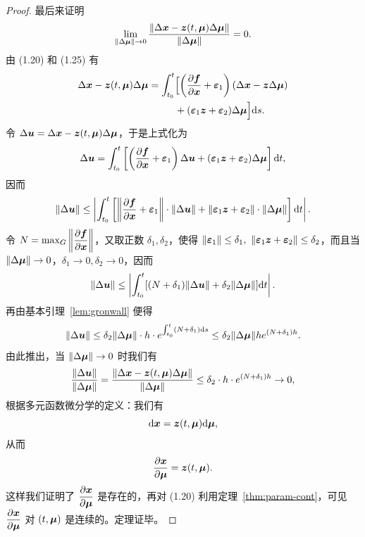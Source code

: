 \begin{proof}
	最后来证明
	\[
		\lim_{\|\Delta\boldsymbol{\mu}\| \to 0} \frac{\|\Delta\boldsymbol{x} - \boldsymbol{z}(t, \boldsymbol{\mu})\Delta\boldsymbol{\mu}\|}{\|\Delta\boldsymbol{\mu}\|} = 0.
	\]
	由 (1.20) 和 (1.25) 有
	\begin{align*}
		\Delta\boldsymbol{x} - \boldsymbol{z}(t, \boldsymbol{\mu})\Delta\boldsymbol{\mu} 
		= \int_{t_0}^t &\Bigl[\left(\frac{\partial \boldsymbol{f}}{\partial \boldsymbol{x}} + \boldsymbol{\varepsilon}_1\right)(\Delta\boldsymbol{x} - \boldsymbol{z}\Delta\boldsymbol{\mu}) \\
		&+ (\boldsymbol{\varepsilon}_1 \boldsymbol{z} + \boldsymbol{\varepsilon}_2)\Delta\boldsymbol{\mu}\Bigr]\mathrm{d} s.
	\end{align*}
	令 $\Delta\boldsymbol{u} = \Delta\boldsymbol{x} - \boldsymbol{z}(t, \boldsymbol{\mu})\Delta\boldsymbol{\mu}$，于是上式化为
	\[
		\Delta\boldsymbol{u} = \int_{t_0}^t \left[\left(\frac{\partial \boldsymbol{f}}{\partial \boldsymbol{x}} + \boldsymbol{\varepsilon}_1\right)\Delta\boldsymbol{u} + (\boldsymbol{\varepsilon}_1 \boldsymbol{z} + \boldsymbol{\varepsilon}_2)\Delta\boldsymbol{\mu}\right]\mathrm{d} t,
	\]
	因而
	\[
		\|\Delta\boldsymbol{u}\| \leq \left|\int_{t_0}^t \left[\left\|\frac{\partial \boldsymbol{f}}{\partial \boldsymbol{x}} + \boldsymbol{\varepsilon}_1\right\| \cdot \|\Delta\boldsymbol{u}\| + \|\boldsymbol{\varepsilon}_1 \boldsymbol{z} + \boldsymbol{\varepsilon}_2\| \cdot \|\Delta\boldsymbol{\mu}\|\right]\mathrm{d} t\right|.
	\]
	令 $N = \max_G \left\|\dfrac{\partial \boldsymbol{f}}{\partial \boldsymbol{x}}\right\|$，又取正数 $\delta_1, \delta_2$，使得 $\|\vect{\varepsilon}_1\| \leq \delta_1,\ \|\vect{\varepsilon}_1 \vect{z} + \vect{\varepsilon}_2\| \leq \delta_2$，而且当 $\|\Delta\boldsymbol{\mu}\| \to 0$，$\delta_1 \to 0, \delta_2 \to 0$，因而
	\[
		\|\Delta\boldsymbol{u}\| \leq \left|\int_{t_0}^t [(N + \delta_1)\|\Delta\boldsymbol{u}\| + \delta_2\|\Delta\boldsymbol{\mu}\|]\mathrm{d} t\right|.
	\]
	再由基本引理~\ref{lem:gronwall} 便得
	\[
		\|\Delta\boldsymbol{u}\| \leq \delta_2 \|\Delta\boldsymbol{\mu}\| \cdot h \cdot e^{\int_{t_0}^t (N + \delta_1)\mathrm{d} s} 
		\leq \delta_2 \|\Delta\boldsymbol{\mu}\| h e^{(N + \delta_1)h}.
	\]
	由此推出，当 $\|\Delta\boldsymbol{\mu}\| \to 0$ 时我们有
	\[
		\frac{\|\Delta\boldsymbol{u}\|}{\|\Delta\boldsymbol{\mu}\|} 
		= \frac{\|\Delta\boldsymbol{x} - \boldsymbol{z}(t, \boldsymbol{\mu})\Delta\boldsymbol{\mu}\|}{\|\Delta\boldsymbol{\mu}\|} 
		\leq \delta_2 \cdot h \cdot e^{(N + \delta_1)h} \to 0,
	\]
	根据多元函数微分学的定义：我们有
	\[
		\mathrm{d}\boldsymbol{x} = \boldsymbol{z}(t, \boldsymbol{\mu})\mathrm{d}\boldsymbol{\mu},
	\]
	从而
	\[
		\frac{\partial \boldsymbol{x}}{\partial \boldsymbol{\mu}} = \boldsymbol{z}(t, \boldsymbol{\mu}).
	\]
	这样我们证明了 $\dfrac{\partial \boldsymbol{x}}{\partial \boldsymbol{\mu}}$ 是存在的，再对 (1.20) 利用定理~\ref{thm:param-cont}，可见 $\dfrac{\partial \boldsymbol{x}}{\partial \boldsymbol{\mu}}$ 对 $(t, \boldsymbol{\mu})$ 是连续的。定理证毕。
\end{proof}

